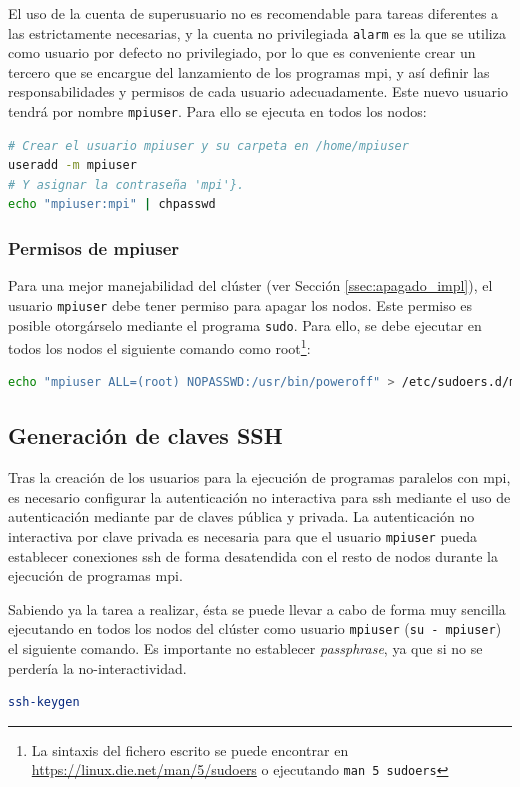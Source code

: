 El uso de la cuenta de superusuario no es recomendable para tareas diferentes a las estrictamente necesarias, y la cuenta no privilegiada \texttt{alarm} es la que se utiliza como usuario por defecto no privilegiado, por lo que es conveniente crear un tercero que se encargue del lanzamiento de los programas \acrshort{mpi}, y así definir las responsabilidades y permisos de cada usuario adecuadamente. Este nuevo usuario tendrá por nombre \texttt{mpiuser}. Para ello se ejecuta en todos los nodos:

\begin{lstlisting}[language=bash]
# Crear el usuario mpiuser y su carpeta en /home/mpiuser
useradd -m mpiuser
# Y asignar la contraseña 'mpi'}.
echo "mpiuser:mpi" | chpasswd
\end{lstlisting}

\subsubsection{Permisos de mpiuser}
Para una mejor manejabilidad del clúster (ver Sección \ref{ssec:apagado_impl}), el usuario \texttt{mpiuser} debe tener permiso para apagar los nodos. Este permiso es posible otorgárselo mediante el programa \texttt{sudo}. Para ello, se debe ejecutar en todos los nodos el siguiente comando como root\footnote{La sintaxis del fichero escrito se puede encontrar en \url{https://linux.die.net/man/5/sudoers} o ejecutando \texttt{man 5 sudoers}}:

\begin{lstlisting}[language=bash]
echo "mpiuser ALL=(root) NOPASSWD:/usr/bin/poweroff" > /etc/sudoers.d/mpiuser_poweroff
\end{lstlisting}

\subsection{Generación de claves SSH}
\label{ssec:gen_ssh}
Tras la creación de los usuarios para la ejecución de programas paralelos con \acrshort{mpi}, es necesario configurar la autenticación no interactiva para \acrshort{ssh} mediante el uso de autenticación mediante par de claves pública y privada. La autenticación no interactiva por clave privada es necesaria para que el usuario \texttt{mpiuser} pueda establecer conexiones \acrshort{ssh} de forma desatendida con el resto de nodos durante la ejecución de programas \acrshort{mpi}.

Sabiendo ya la tarea a realizar, ésta se puede llevar a cabo de forma muy sencilla ejecutando en todos los nodos del clúster como usuario \texttt{mpiuser} (\texttt{su - mpiuser}) el siguiente comando. Es importante no establecer \textit{passphrase}, ya que si no se perdería la no-interactividad.
\begin{lstlisting}[language=bash]
ssh-keygen
\end{lstlisting}

